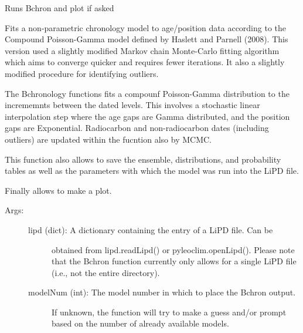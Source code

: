 \documentclass[letterpaper,10pt,english]{sphinxmanual}
\begin{document}
\begin{fulllineitems}
\label{\detokenize{Main:pyleoclim.Bchron}}
Runs Bchron and plot if asked

Fits a non-parametric chronology model to age/position data according to
the Compound Poisson-Gamma model defined by Haslett and Parnell (2008).
This version used a slightly modified Markov chain Monte-Carlo fitting
algorithm which aims to converge quicker and requires fewer iterations.
It also a slightly modified procedure for identifying outliers.

The Bchronology functions fits a compounf Poisson-Gamma distribution to the
incrememnts between the dated levels. This involves a stochastic linear
interpolation step where the age gaps are Gamma distributed, and the position
gaps are Exponential. Radiocarbon and non-radiocarbon dates (including outliers)
are updated within the fucntion also by MCMC.

This function also allows to save the ensemble, distributions, and probability
tables as well as the parameters with which the model was run into the LiPD file.

Finally allows to make a plot.
\begin{description}
\item[{Args:}] \leavevmode\begin{description}
\item[{lipd (dict): A dictionary containing the entry of a LiPD file. Can be}] \leavevmode
obtained from lipd.readLipd() or pyleoclim.openLipd(). Please note
that the Bchron function currently only allows for a single LiPD file
(i.e., not the entire directory).

\item[{modelNum (int): The model number in which to place the Bchron output.}] \leavevmode
If unknown, the function will try to make a guess and/or prompt
based on the number of already available models.


\end{description}
\end{description}
\end{fulllineitems}
\end{document}
